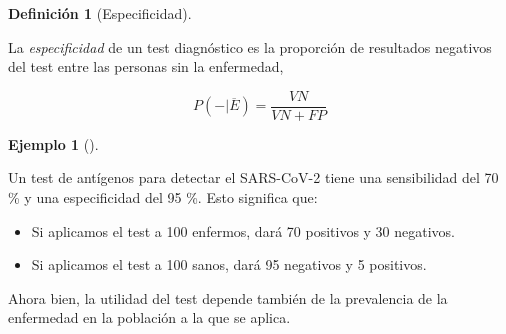 \documentclass[
  spanish,
  a4paper,
]{scrreport}
\providecommand{\tightlist}{%
  \setlength{\itemsep}{0pt}\setlength{\parskip}{0pt}}
\theoremstyle{definition}
\newtheorem{definition}{Definición}[chapter]
\theoremstyle{definition}
\newtheorem{example}{Ejemplo}[chapter]
\theoremstyle{remark}
\begin{document}
\begin{definition}[Especificidad]\protect\hypertarget{def-especificidad}{}\label{def-especificidad}

La \emph{especificidad} de un test diagnóstico es la proporción de
resultados negativos del test entre las personas sin la enfermedad,

\[P(-|\overline{E})=\frac{VN}{VN+FP}\]

\end{definition}

\begin{example}[]\protect\hypertarget{exm-sensibilidad-especificidad}{}\label{exm-sensibilidad-especificidad}

Un test de antígenos para detectar el SARS-CoV-2 tiene una sensibilidad
del 70 \% y una especificidad del 95 \%. Esto significa que:

\begin{itemize}
\tightlist
\item
  Si aplicamos el test a 100 enfermos, dará 70 positivos y 30 negativos.
\item
  Si aplicamos el test a 100 sanos, dará 95 negativos y 5 positivos.
\end{itemize}

\end{example}

Ahora bien, la utilidad del test depende también de la prevalencia de la
enfermedad en la población a la que se aplica.
\end{document}
